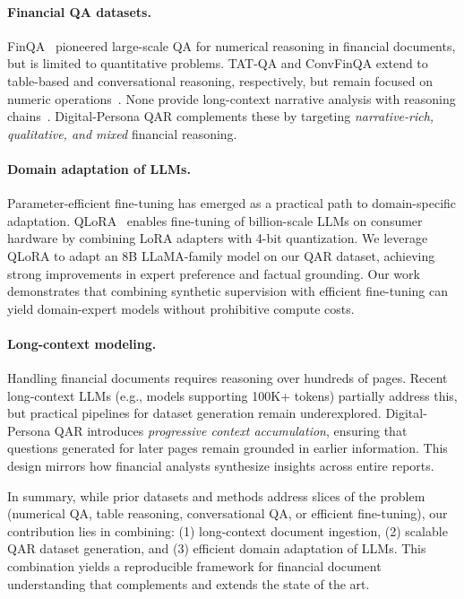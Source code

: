 \documentclass[sigconf,authordraft,anonymous]{acmart}
\begin{document}
\paragraph{Financial QA datasets.}
FinQA~\cite{chen2022finqadatasetnumericalreasoning} pioneered large-scale QA for numerical reasoning in financial documents, but is limited to quantitative problems. TAT-QA and ConvFinQA extend to table-based and conversational reasoning, respectively, but remain focused on numeric operations~\cite{Zhu2021TATQA,Chen2022ConvFinQA}. None provide long-context narrative analysis with reasoning chains~\cite{Reddy2024DocFinQA}. Digital-Persona QAR complements these by targeting \emph{narrative-rich, qualitative, and mixed} financial reasoning.

\paragraph{Domain adaptation of LLMs.}
Parameter-efficient fine-tuning has emerged as a practical path to domain-specific adaptation. QLoRA~\cite{dettmers2023qloraefficientfinetuningquantized} enables fine-tuning of billion-scale LLMs on consumer hardware by combining LoRA adapters with 4-bit quantization. We leverage QLoRA to adapt an 8B LLaMA-family model on our QAR dataset, achieving strong improvements in expert preference and factual grounding. Our work demonstrates that combining synthetic supervision with efficient fine-tuning can yield domain-expert models without prohibitive compute costs.

\paragraph{Long-context modeling.}
Handling financial documents requires reasoning over hundreds of pages. Recent long-context LLMs (e.g., models supporting 100K+ tokens) partially address this, but practical pipelines for dataset generation remain underexplored. Digital-Persona QAR introduces \emph{progressive context accumulation}, ensuring that questions generated for later pages remain grounded in earlier information. This design mirrors how financial analysts synthesize insights across entire reports.

In summary, while prior datasets and methods address slices of the problem (numerical QA, table reasoning, conversational QA, or efficient fine-tuning), our contribution lies in combining: (1) long-context document ingestion, (2) scalable QAR dataset generation, and (3) efficient domain adaptation of LLMs. This combination yields a reproducible framework for financial document understanding that complements and extends the state of the art.
\end{document}
